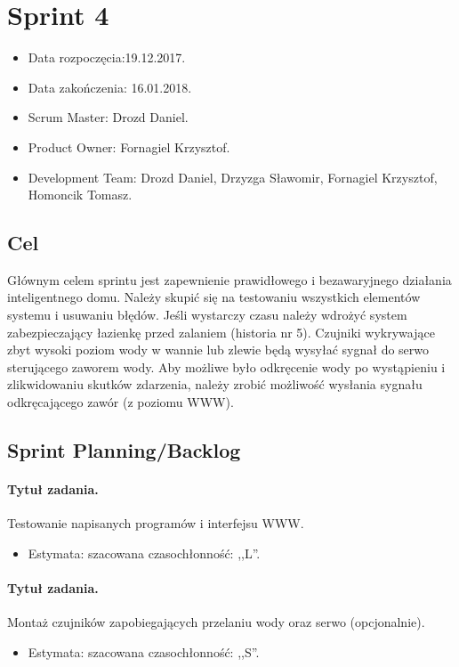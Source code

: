 \section{Sprint 4}
\begin{itemize}
	\item Data rozpoczęcia:19.12.2017.
	\item Data zakończenia: 16.01.2018.
	\item Scrum Master: Drozd Daniel.
	\item Product Owner: Fornagiel Krzysztof.
	\item Development Team: Drozd Daniel, Drzyzga Sławomir, Fornagiel Krzysztof, Homoncik Tomasz.
\end{itemize}
\subsection{Cel} 

Głównym celem sprintu jest zapewnienie prawidłowego i bezawaryjnego działania inteligentnego domu. Należy skupić się na testowaniu wszystkich elementów systemu i usuwaniu błędów. Jeśli wystarczy czasu należy wdrożyć system zabezpieczający łazienkę przed zalaniem (historia nr 5). Czujniki wykrywające zbyt wysoki poziom wody w wannie lub zlewie będą wysyłać sygnał do serwo sterującego zaworem wody. Aby możliwe było odkręcenie wody po wystąpieniu i zlikwidowaniu skutków zdarzenia, należy zrobić możliwość wysłania sygnału odkręcającego zawór (z poziomu WWW).


\subsection{Sprint Planning/Backlog}

\paragraph{Tytuł zadania.} Testowanie napisanych programów i interfejsu WWW.
\begin{itemize}
	\item Estymata: szacowana czasochłonność: ,,L''.
\end{itemize}

\paragraph{Tytuł zadania.} Montaż czujników zapobiegających przelaniu wody oraz serwo (opcjonalnie).
\begin{itemize}
	\item Estymata: szacowana czasochłonność: ,,S''.
\end{itemize}

